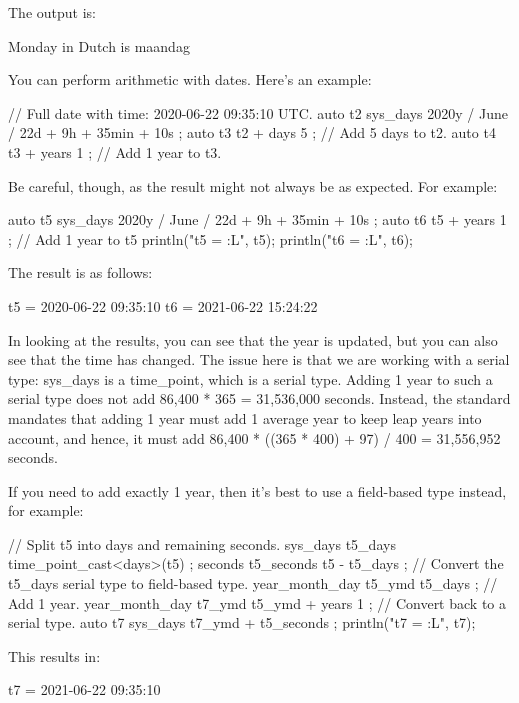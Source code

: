 
The output is:

\begin{shell}
Monday in Dutch is maandag
\end{shell}


You can perform arithmetic with dates. Here’s an example:

\begin{cpp}
// Full date with time: 2020-06-22 09:35:10 UTC.
auto t2 { sys_days { 2020y / June / 22d } + 9h + 35min + 10s };
auto t3 { t2 + days { 5 } }; // Add 5 days to t2.
auto t4 { t3 + years { 1 } }; // Add 1 year to t3.
\end{cpp}

Be careful, though, as the result might not always be as expected. For example:

\begin{cpp}
auto t5 { sys_days { 2020y / June / 22d } + 9h + 35min + 10s };
auto t6 { t5 + years { 1 } }; // Add 1 year to t5
println("t5 = {:L}", t5);
println("t6 = {:L}", t6);
\end{cpp}

The result is as follows:

\begin{shell}
t5 = 2020-06-22 09:35:10
t6 = 2021-06-22 15:24:22
\end{shell}

In looking at the results, you can see that the year is updated, but you can also see that the time has changed. The issue here is that we are working with a serial type: sys\_days is a time\_point, which is a serial type. Adding 1 year to such a serial type does not add 86,400 * 365 = 31,536,000 seconds. Instead, the standard mandates that adding 1 year must add 1 average year to keep leap years into account, and hence, it must add 86,400 * ((365 * 400) + 97) / 400 = 31,556,952 seconds.

If you need to add exactly 1 year, then it’s best to use a field-based type instead, for example:

\begin{cpp}
// Split t5 into days and remaining seconds.
sys_days t5_days { time_point_cast<days>(t5) };
seconds t5_seconds { t5 - t5_days };
// Convert the t5_days serial type to field-based type.
year_month_day t5_ymd { t5_days };
// Add 1 year.
year_month_day t7_ymd { t5_ymd + years { 1 } };
// Convert back to a serial type.
auto t7 { sys_days { t7_ymd } + t5_seconds };
println("t7 = {:L}", t7);
\end{cpp}

This results in:

\begin{shell}
t7 = 2021-06-22 09:35:10
\end{shell}




